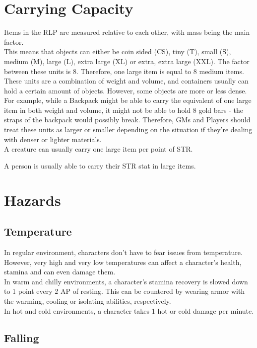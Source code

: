 \section{Carrying Capacity}\label{sec:carryingCapacity}
Items in the RLP are measured relative to each other, with mass being the main factor.\\
This means that objects can either be coin sided (CS), tiny (T), small (S), medium (M), large (L), extra large (XL) or extra, extra large (XXL).
The factor between these units is 8.
Therefore, one large item is equal to 8 medium items.
These units are a combination of weight and volume, and containers usually can hold a certain amount of objects.
However, some objects are more or less dense.
For example, while a Backpack might be able to carry the equivalent of one large item in both weight and volume, it might not be able to hold 8 gold bars - the straps of the backpack would possibly break.
Therefore, GMs and Players should treat these units as larger or smaller depending on the situation if they're dealing with denser or lighter materials.\\
A creature can usually carry one large item per point of STR.

A person is usually able to carry their STR stat in large items.\\

\section{Hazards}\label{sec:hazards}
\subsection{Temperature}\label{subsec:temperature}
In regular environment, characters don't have to fear issues from temperature.
However, very high and very low temperatures can affect a character's health, stamina and can even damage them.\\

In warm and chilly environments, a character's stamina recovery is slowed down to 1 point every 2 AP of resting.
This can be countered by wearing armor with the warming, cooling or isolating abilities, respectively.\\

In hot and cold environments, a character takes 1 hot or cold damage per minute.

\subsection{Falling}\label{subsec:falling}
